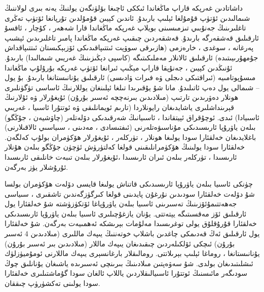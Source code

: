 \documentclass[a4paper]{article}
\begin{document}
\begin{flushright}
داشاتادىن غەرپكە قاراپ ماڭغاندا ئىككى ئاچىغا بۆلۈنگەن يولنىڭ يەنە بىرى لولاننىڭ شىمالىدىن ئۆتۈپ قۇمۇلغا ئېلىپ بارىدۇ. ئاندىن كېيىن قۇمۇلدىن تۇرپانغا ئۆتۈپ تەڭرى تاغلىرىنىڭ جەنۇبىي تىزمىسىنى بويلاپ غەرپكە ماڭغاندا قارا شەھەر ، كۇچار ، ئاقسۇ ئارقىلىق قەشقەرگە بارىدۇ. قەشقەردىن چىقىپ غەرپكە ماڭغاندا پامىر تاغلىرىدىن ئېشىپ پەرغانە ، سوغدى ، خارەزمى (ھازىرقى سوۋېت ئىتتىپاقىدىكى ئۆزبېكىستان ئىتتىپاقداش جۇمھۇرىيىتىدە) ئارقىلىق ئالانلار مەملىكىتىگە (كاسپى دېڭىزىنىڭ غەريىي شىمالىدا) بارىدۇ. ئۇنىڭدىن كېيىن ، جەنۇپقا قاراپ مېڭىپ ئىرانغا ئۆتۈپ غەرپكە بۇرۇلۇپ ماڭغاندا مىسۇپوتامىيە (ئىراقتىكى دىجلى ۋە فىرات ۋادىسى) ئارقىلىق يۇنانىستانغا بارىدۇ. بۇ يول – شىمالى يول دەپ ئاتىلىدۇ. مانا شۇ يۇقىرىدا تىلغا ئېلىنغان يوللارنىڭ ئاساسى تۈگۈنلىرى ھونلار دەۋرىدىن تارتىپ (مىلادىدىن بىرنەچچە ئەسىر بۇرۇن) ئۇيغۇرلار ۋە ئۇلارنىڭ قېرىنداشلىرى ياشايدىغان رايونلاردا (تارىم ئويمانلىقى ۋە ئوتتۇرا ئاسىيا ، غەربىي ئاسىيادا) ئىدى. ئوچۇقراق ئېيتقاندا ، ئاسىيانىڭ شەرقىدىكى دۆلەتلەر (چاۋشيەن ، جۇڭگو) بىلەن ياۋرۇپا ئارىسىدىكى مۇناسىۋەتلەرنى (ئىفتىسادى ، مەدىنى ، سىياسىي ئالاقىلارنى) باغلايدىغان خەلقئارا سودا يولىغا ھونلار ، تۈركلەر ، ئۇيغۇرلار ھۆكۈمران بولۇپ كەلگەن. خەلقئارا سودا يولىنىڭ ھۆكۈمرانلىقىنى قولغا كەلتۈرۈش ئۈچۈن جۇڭگو بىلەن ھۇنلار ئارىسىدا ، تۈركلەر بىلەن ئىران ئارىسىدا ،ئۇيغۇرلار بىلەن تىبەت خانلىقى ئارىسىدا ئۇرۇشلار يۈز بەرگەن.



چۈنكى ئاسىيا بىلەن ياۋرۇپا ئارىسىدىكى قاتناش يولىغا قايسى دۆلەت ھۆكۈمران بولسا شۇ دۆلەت خەلقئارا سودىدىن نۇرغۇن پايدىنى قولغا كىرگۈزگەندىن تاشقىرى ، سىياسى جەھەتتىمۇئۆزىنىڭ تەسىرىنى ئاسىيا بىلەن ياۋرۇپاغا ئۆتكۈزۈشتە شۇ خەلقئارا يول ئارقىلىق ئۆز مەقسىتىگە يېتەتتى. يۇنان يازغۇچىلىرى ئاسىيا بىلەن ياۋرۇپا ئارىسىدىكى خەلقئارا قۇرۇقلۇق يولى توغرىسىدا مەلۇمات بېرىشكە ئەھمىيەت بەرگەن. شۇ خەلقئارا يول ئارقىلىق ئەڭ قەدىمكى چاغدىن باشلاپ خوتەننىڭ يىپەك ماللىرى (مىلادىدىن 4 ئەسىر بۇرۇن) ئىچكى ئۆلكىلەردىن چىقىدىغان يىپەك ماللار (مىلادىدىن بىر ئەسىر بۇرۇن) يۇنانىستانغا ، روماغا ئېلىپ بېرىلاتتى. رومالىقلار بارغانسېرى يىپەك ماللارنى ئومۇميۈزلۈك ئىشلىتىدىغان بولدى. شۇ سەۋەپتىن مىلادىنىڭ بىرىنچى ئەسىرىدە ياشىغان يۇنانلىق چوڭ سودىگەر مائىسنىڭ ئوتتۇرا ئاسىيالىقلاردىن ياللاپ ئالغان سودا گۇماشتىلىرى خەلفئارا سودا يولىنى تەكشۈرۈپ چىققان.




\end{flushright}
\end{document}
